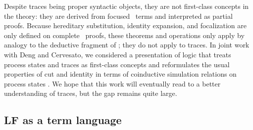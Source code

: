 Despite traces being proper syntactic objects, they are not
first-class concepts in the theory: they are derived from focused
\ollll~terms and interpreted as partial proofs. Because hereditary
substitution, identity expansion, and focalization are only defined on
complete \ollll~proofs, these theorems and operations only apply by
analogy to the deductive fragment of \sls; they do not apply to
traces.  In joint work with Deng and Cervesato, we considered a
presentation of logic that treats process states and traces as
first-class concepts and reformulates the usual properties of cut and
identity in terms of coinductive simulation relations on process
states \cite{deng12relating}. We hope that this work will eventually
read to a better understanding of traces, but the gap remains quite
large.






\subsection{LF as a term language}
\label{sec:why-not-fully-dependent}


